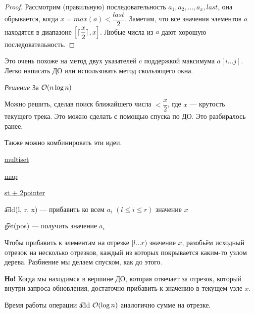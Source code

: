 \begin{proof}
	Рассмотрим (правильную) последовательность $a_1, a_2, \ldots, a_x, last$, она обрывается, когда $x=max(a) < \dfrac{last}{2}$. Заметим, что все значения элементов $a$ находятся в диапазоне $\left[\ceil{\dfrac{x}{2}}, x\right]$. Любые числа из $a$ дают хорошую последовательность.
\end{proof}

Это очень похоже на метод двух указателей c поддержкой максимума $a[i \ldots j]$. Легко написать ДО или использовать метод скользящего окна.

\down

{\it Решение } За $ \mathcal{O}(n \log n)$
\href{https://codeforces.com/contest/1237/submission/62700019}{}

Можно решить, сделав поиск ближайшего числа $< \dfrac{x}{2}$, где $x$ --- крутость текущего трека. Это можно сделать с помощью спуска по ДО. Это разбиралось ранее. 

Также можно комбинировать эти идеи.

\href{https://codeforces.com/contest/1237/submission/62700598}{multiset }

\href{https://codeforces.com/contest/1237/submission/62695687}{map }

\href{https://codeforces.com/contest/1237/submission/62712896}{st + 2pointer }

\pagebreak


\begin{MyList}[0pt]
	\item \t{add(l, r, x)} --- прибавить ко всем $a_i$ $(l \le i \le r)$ значение $x$
	\item \t{get(pos)} --- получить значение $a_i$
\end{MyList}
\up \up


Чтобы прибавить к элементам на отрезке $[l \ldots r)$ значение $x$, разобьём исходный отрезок на несколько отрезков, каждый из которых покрывается каким-то узлом дерева. Разбиение мы делаем спуском, как до этого.

{\bf Но!} Когда мы находимся в вершине ДО, которая отвечает за отрезок, который внутри запроса обновления, достаточно прибавить к значению в текущем узле $x$.

Время работы операции \t{add} $ \mathcal{O}(\log n)$ аналогично сумме на отрезке.
\down

